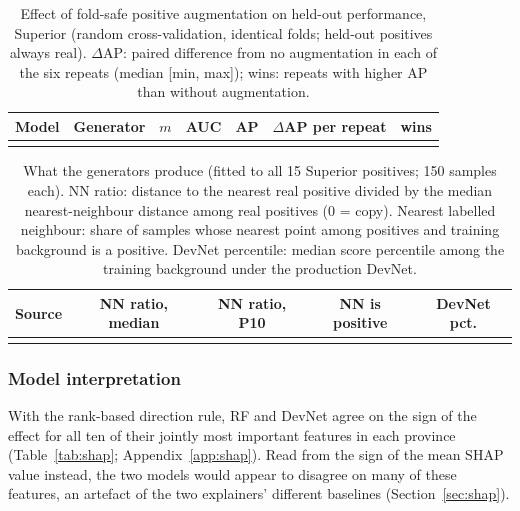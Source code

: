 \documentclass[pdflatex,sn-apa]{sn-jnl}
\begin{document}
\begin{table}[t]
\caption{Effect of fold-safe positive augmentation on held-out performance, Superior (random cross-validation, identical folds; held-out positives always real). $\Delta$AP: paired difference from no augmentation in each of the six repeats (median [min, max]); wins: repeats with higher AP than without augmentation.}\label{tab:augmentation}
\scriptsize
\setlength{\tabcolsep}{2.5pt}
\begin{tabular*}{\textwidth}{@{\extracolsep\fill}lllcccc}
\toprule
Model & Generator & $m$ & AUC & AP & $\Delta$AP per repeat & wins \\
\midrule
\botrule
\end{tabular*}
\end{table}

\begin{table}[t]
\caption{What the generators produce (fitted to all 15 Superior positives; 150 samples each). NN ratio: distance to the nearest real positive divided by the median nearest-neighbour distance among real positives (0 = copy). Nearest labelled neighbour: share of samples whose nearest point among positives and training background is a positive. DevNet percentile: median score percentile among the training background under the production DevNet.}\label{tab:aug-diag}
\footnotesize
\setlength{\tabcolsep}{2.5pt}
\begin{tabular*}{\textwidth}{@{\extracolsep\fill}lcccc}
\toprule
Source & NN ratio, median & NN ratio, P10 & NN is positive & DevNet pct. \\
\midrule
\botrule
\end{tabular*}
\end{table}

\subsubsection{Model interpretation}\label{sec:res-shap}

With the rank-based direction rule, RF and DevNet agree on the sign of the effect for all ten of their jointly most important features in each province (Table~\ref{tab:shap}; Appendix~\ref{app:shap}). Read from the sign of the mean SHAP value instead, the two models would appear to disagree on many of these features, an artefact of the two explainers' different baselines (Section~\ref{sec:shap}).
\end{document}
